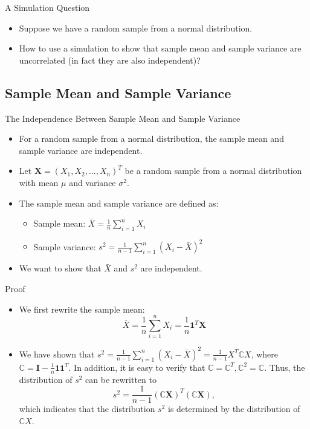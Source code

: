 \documentclass[
  ignorenonframetext,
]{beamer}
\providecommand{\tightlist}{%
  \setlength{\itemsep}{0pt}\setlength{\parskip}{0pt}}
\begin{document}
\begin{frame}{A Simulation Question}
\protect\hypertarget{a-simulation-question}{}
\begin{itemize}
\tightlist
\item
  Suppose we have a random sample from a normal distribution.
\item
  How to use a simulation to show that sample mean and sample variance
  are uncorrelated (in fact they are also independent)?
\end{itemize}
\end{frame}

\hypertarget{sample-mean-and-sample-variance}{%
\subsection{Sample Mean and Sample
Variance}\label{sample-mean-and-sample-variance}}

\begin{frame}{The Independence Between Sample Mean and Sample Variance}
\protect\hypertarget{the-independence-between-sample-mean-and-sample-variance}{}
\begin{itemize}
\item
  For a random sample from a normal distribution, the sample mean and
  sample variance are independent.
\item
  Let \(\mathbf X =(X_1, X_2, ..., X_n)^T\) be a random sample from a
  normal distribution with mean \(\mu\) and variance \(\sigma^2\).
\item
  The sample mean and sample variance are defined as:

  \begin{itemize}
  \item
    Sample mean: \(\bar{X} = \frac{1}{n} \sum_{i=1}^{n} X_i\)
  \item
    Sample variance:
    \(s^2 = \frac{1}{n-1} \sum_{i=1}^{n} (X_i - \bar{X})^2\)
  \end{itemize}
\item
  We want to show that \(\bar{X}\) and \(s^2\) are independent.
\end{itemize}
\end{frame}

\begin{frame}{Proof}
\protect\hypertarget{proof}{}
\begin{itemize}
\item
  We first rewrite the sample mean:
  \[\bar{X} = \frac{1}{n} \sum_{i=1}^{n} X_i =\frac{1}{n}\mathbf 1^T \mathbf X \]
\item
  We have shown that
  \(s^2 = \frac{1}{n-1} \sum_{i=1}^{n} (X_i - \bar{X})^2=\frac{1}{n-1}X^T\mathbb CX\),
  where \(\mathbb C=\mathbf I - \frac{1}{n}\mathbf 1 \mathbf 1^T\). In
  addition, it is easy to verify that
  \(\mathbb C=\mathbb C^T, \mathbb C^2=\mathbb C\). Thus, the
  distribution of \(s^2\) can be rewritten to
  \[s^2=\frac{1}{n-1} (\mathbb C\mathbf X)^T (\mathbb C\mathbf X),\]
  which indicates that the distribution \(s^2\) is determined by the
  distribution of \(\mathbb C X\).
\end{itemize}
\end{frame}
\end{document}
